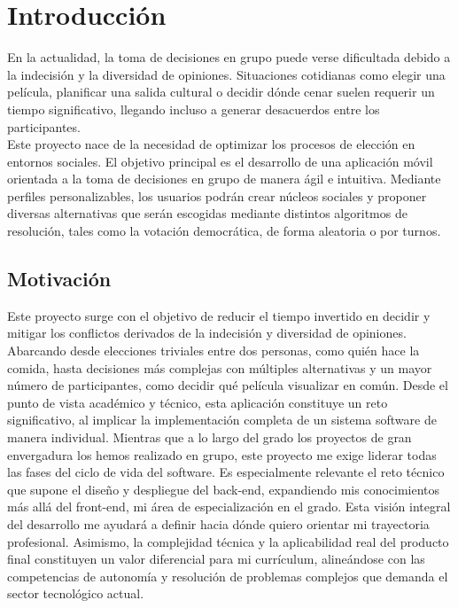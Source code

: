 \chapter{Introducción}

En la actualidad, la toma de decisiones en grupo puede verse dificultada debido a la indecisión y la diversidad de opiniones. Situaciones cotidianas como elegir una película, planificar una salida cultural o decidir dónde cenar suelen requerir un tiempo significativo, llegando incluso a generar desacuerdos entre los participantes. \\

Este proyecto nace de la necesidad de optimizar los procesos de elección en entornos sociales. El objetivo principal es el desarrollo de una aplicación móvil orientada a la toma de decisiones en grupo de manera ágil e intuitiva. Mediante perfiles personalizables, los usuarios podrán crear núcleos sociales y proponer diversas alternativas que serán escogidas mediante distintos algoritmos de resolución, tales como la votación democrática, de forma aleatoria o por turnos.\\

\section{Motivación}
Este proyecto surge con el objetivo de reducir el tiempo invertido en decidir y mitigar los conflictos derivados de la indecisión y diversidad de opiniones. Abarcando desde elecciones triviales entre dos personas, como quién hace la comida, hasta decisiones más complejas con múltiples alternativas y un mayor número de participantes, como decidir qué película visualizar en común. Desde el punto de vista académico y técnico, esta aplicación constituye un reto significativo, al implicar la implementación completa de un sistema software de manera individual. Mientras que a lo largo del grado los proyectos de gran envergadura los hemos realizado en grupo, este proyecto me exige liderar todas las fases del ciclo de vida del software. Es especialmente relevante el reto técnico que supone el diseño y despliegue del back-end, expandiendo mis conocimientos más allá del front-end, mi área de especialización en el grado. Esta visión integral del desarrollo me ayudará a definir hacia dónde quiero orientar mi trayectoria profesional. Asimismo, la complejidad técnica y la aplicabilidad real del producto final constituyen un valor diferencial para mi currículum, alineándose con las competencias de autonomía y resolución de problemas complejos que demanda el sector tecnológico actual.

